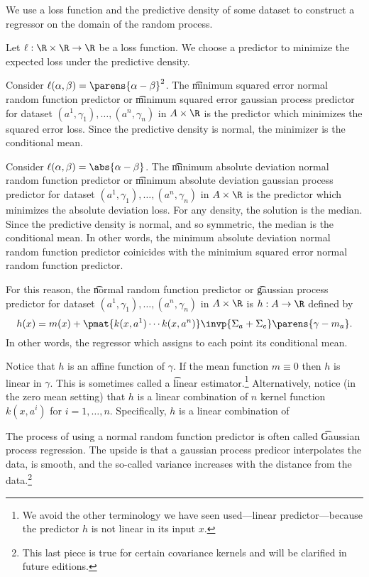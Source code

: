 

We use a loss function and the predictive density of some dataset to construct a regressor on the domain of the random process.


Let $\ell: \R \times \R \to \R$ be a loss function.
We choose a predictor to minimize the expected loss under the predictive density.

Consider $\ell(\alpha, \beta) = \parens{\alpha - \beta}^2$.
The \t{minimum squared error normal random function predictor} or \t{minimum squared error gaussian process predictor} for dataset $(a^1, \gamma_1), \dots, (a^n, \gamma_n)$ in $A \times \R$ is the predictor which minimizes the squared error loss.
Since the predictive density is normal, the minimizer is the conditional mean.

Consider $\ell(\alpha, \beta) = \abs{\alpha - \beta}$.
The \t{minimum absolute deviation normal random function predictor} or \t{minimum absolute deviation gaussian process predictor} for dataset $(a^1, \gamma_1), \dots, (a^n, \gamma_n)$ in $A \times \R$ is the predictor which minimizes the absolute deviation loss.
For any density, the solution is the median.
Since the predictive density is normal, and so symmetric, the median is the conditional mean.
In other words, the minimum absolute deviation normal random function predictor coinicides with the minimium squared error normal random function predictor.


For this reason, the \t{normal random function predictor} or \t{gaussian process predictor} for dataset $(a^1, \gamma_1), \dots, (a^n, \gamma_n)$ in $A \times \R$ is $h: A \to \R$ defined by
\[
  h(x) = m(x) + \pmat{k(x,a^1) \cdots k(x, a^n)}\invp{\Sigma_{a} + \Sigma_{e}}\parens{\gamma - m_{a}}.
\]
In other words, the regressor which assigns to each point its conditional mean.

Notice that $h$ is an affine function of $\gamma$.
If the mean function $m \equiv 0$ then $h$ is linear in $\gamma$.
This is sometimes called a \t{linear estimator}.\footnote{We avoid the other terminology we have seen used---linear predictor---because the predictor $h$ is not linear in its input $x$.}
Alternatively, notice (in the zero mean setting) that $h$ is a linear combination of $n$ kernel function $k(x, a^i)$ for $i = 1, \dots, n$.
Specifically, $h$ is a linear combination of

The process of using a normal random function predictor is often called \t{Gaussian process regression}.
The upside is that a gaussian process predicor interpolates the data, is smooth, and the so-called variance increases with the distance from the data.\footnote{This last piece is true for certain covariance kernels and will be clarified in future editions.}
